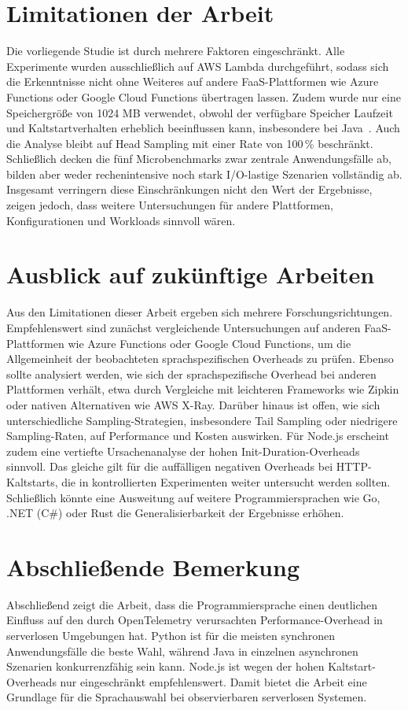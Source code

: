 \section{Limitationen der Arbeit}

Die vorliegende Studie ist durch mehrere Faktoren eingeschränkt. Alle Experimente wurden ausschließlich auf AWS Lambda durchgeführt, 
sodass sich die Erkenntnisse nicht ohne Weiteres auf andere FaaS-Plattformen wie Azure Functions oder Google Cloud Functions übertragen 
lassen. Zudem wurde nur eine Speichergröße von 1024 MB verwendet, obwohl der verfügbare Speicher Laufzeit und Kaltstartverhalten 
erheblich beeinflussen kann, insbesondere bei Java~\cite{Rodriguez2024Evaluation}. Auch die Analyse bleibt auf Head Sampling mit einer 
Rate von 100\,\% beschränkt. Schließlich decken die fünf Microbenchmarks zwar zentrale Anwendungsfälle ab, bilden aber weder 
rechenintensive noch stark I/O-lastige Szenarien vollständig ab. Insgesamt verringern diese Einschränkungen nicht den Wert der 
Ergebnisse, zeigen jedoch, dass weitere Untersuchungen für andere Plattformen, Konfigurationen und Workloads sinnvoll wären.

\section{Ausblick auf zukünftige Arbeiten}

Aus den Limitationen dieser Arbeit ergeben sich mehrere Forschungsrichtungen. Empfehlenswert sind zunächst vergleichende Untersuchungen 
auf anderen FaaS-Plattformen wie Azure Functions oder Google Cloud Functions, um die Allgemeinheit der beobachteten sprachspezifischen 
Overheads zu prüfen. Ebenso sollte analysiert werden, wie sich der sprachspezifische Overhead bei anderen Plattformen verhält, etwa durch 
Vergleiche mit leichteren Frameworks wie Zipkin oder nativen Alternativen wie AWS X-Ray. Darüber hinaus ist offen, wie sich 
unterschiedliche Sampling-Strategien, insbesondere Tail Sampling oder niedrigere Sampling-Raten, auf Performance und Kosten auswirken. 
Für Node.js erscheint zudem eine vertiefte Ursachenanalyse der hohen Init-Duration-Overheads sinnvoll. Das gleiche gilt für die 
auffälligen negativen Overheads bei HTTP-Kaltstarts, die in kontrollierten Experimenten weiter untersucht werden sollten. 
Schließlich könnte eine Ausweitung auf weitere Programmiersprachen wie Go, .NET (C\#) oder Rust die Generalisierbarkeit der Ergebnisse erhöhen. 
\section{Abschließende Bemerkung}

Abschließend zeigt die Arbeit, dass die Programmiersprache einen deutlichen Einfluss auf den durch OpenTelemetry verursachten Performance-Overhead in serverlosen Umgebungen hat. Python ist für die meisten synchronen Anwendungsfälle die beste Wahl, während Java in einzelnen asynchronen Szenarien konkurrenzfähig sein kann. Node.js ist wegen der hohen Kaltstart-Overheads nur eingeschränkt empfehlenswert. Damit bietet die Arbeit eine Grundlage für die Sprachauswahl bei observierbaren serverlosen Systemen.